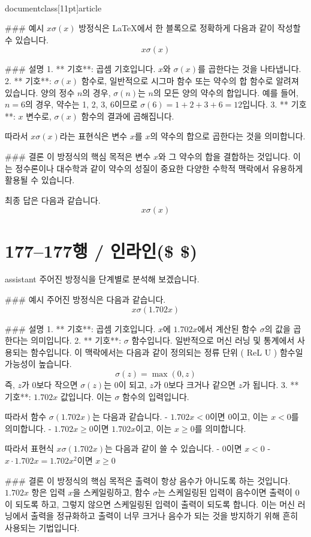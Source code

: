 \\documentclass[11pt]{article}
\begin{document}
### 예시
\( x \sigma(x) \) 방정식은 LaTeX에서 한 블록으로 정확하게 다음과 같이 작성할 수 있습니다.
\[ x \sigma(x) \]

### 설명
1. ** 기호**: 곱셈 기호입니다. \( x \)와 \( \sigma(x) \)를 곱한다는 것을 나타냅니다.
2. ** 기호**: \( \sigma(x) \) 함수로, 일반적으로 시그마 함수 또는 약수의 합 함수로 알려져 있습니다. 양의 정수 \( n \)의 경우, \( \sigma(n) \)는 \( n \)의 모든 양의 약수의 합입니다. 예를 들어, \( n = 6 \)의 경우, 약수는 1, 2, 3, 6이므로 \( \sigma(6) = 1 + 2 + 3 + 6 = 12 \)입니다.
3. ** 기호**: \( x \) 변수로, \( \sigma(x) \) 함수의 결과에 곱해집니다.

따라서 \( x \sigma(x) \)라는 표현식은 변수 \( x \)를 \( x \)의 약수의 합으로 곱한다는 것을 의미합니다.

### 결론
이 방정식의 핵심 목적은 변수 \( x \)와 그 약수의 합을 결합하는 것입니다. 이는 정수론이나 대수학과 같이 약수의 성질이 중요한 다양한 수학적 맥락에서 유용하게 활용될 수 있습니다.

최종 답은 다음과 같습니다.
\[ \boxed{x \sigma(x)} \]

\section*{177–177행 / 인라인(\$ \$) }
assistant
주어진 방정식을 단계별로 분석해 보겠습니다.

### 예시
주어진 방정식은 다음과 같습니다.
\[ x \sigma(1.702 x) \]

### 설명
1. ** 기호**: 곱셈 기호입니다. \( x \)에 \(1.702 x\)에서 계산된 함수 \(\sigma\)의 값을 곱한다는 의미입니다.
2. ** 기호**: \(\sigma\) 함수입니다. 일반적으로 머신 러닝 및 통계에서 사용되는 함수입니다. 이 맥락에서는 다음과 같이 정의되는 정류 단위 ( ReL U ) 함수일 가능성이 높습니다.
\[
   \sigma(z) = \max(0, z)
   \]
즉, \(z\)가 0보다 작으면 \(\sigma(z)\)는 0이 되고, \(z\)가 0보다 크거나 같으면 \(z\)가 됩니다.
3. ** 기호**: \(1.702 x\) 값입니다. 이는 \(\sigma\) 함수의 입력입니다.

따라서 함수 \(\sigma(1.702 x)\)는 다음과 같습니다.
- \(1.702 x < 0\)이면 0이고, 이는 \(x < 0\)를 의미합니다.
- \(1.702 x \geq 0\)이면 \(1.702 x\)이고, 이는 \(x \geq 0\)를 의미합니다.

따라서 표현식 \(x \sigma(1.702 x)\)는 다음과 같이 쓸 수 있습니다.
- \(0\)이면 \(x < 0\)
- \(x \cdot 1.702 x = 1.702 x^2\)이면 \(x \geq 0\)

### 결론
이 방정식의 핵심 목적은 출력이 항상 음수가 아니도록 하는 것입니다. \(1.702 x\) 항은 입력 \(x\)을 스케일링하고, 함수 \(\sigma\)는 스케일링된 입력이 음수이면 출력이 0이 되도록 하고, 그렇지 않으면 스케일링된 입력이 출력이 되도록 합니다. 이는 머신 러닝에서 출력을 정규화하고 출력이 너무 크거나 음수가 되는 것을 방지하기 위해 흔히 사용되는 기법입니다.
\end{document}
